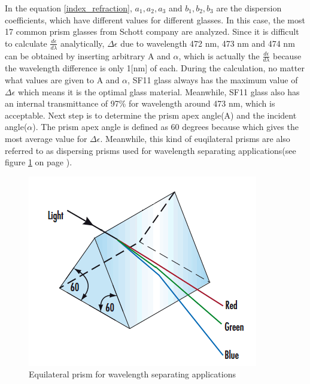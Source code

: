 In the equation \ref{index_refraction}, $a_{1}, a_{2}, a_{3}$ and $b_{1}, b_{2}, b_{3}$ are the dispersion coefficients, which have different values for different glasses. In this case, the most 17 common prism glasses from Schott\cite{prism_material}\cite{prism_book} company are analyzed. Since it is difficult to calculate $\frac{d\epsilon}{d\lambda}$ analytically, $\Delta\epsilon$ due to wavelength 472 nm, 473 nm and 474 nm can be obtained by inserting arbitrary A and $\alpha$, which is actually the $\frac{d\epsilon}{d\lambda}$ because the wavelength difference is only 1[nm] of each. During the calculation, no matter what values are given to A and $\alpha$, SF11 glass always has the maximum value of $\Delta\epsilon$ which means it is the optimal glass material. Meanwhile, SF11 glass also has an internal transmittance of 97\% for wavelength around 473 nm, which is acceptable. Next step is to determine the prism apex angle(A) and the incident angle($\alpha$). The prism apex angle is defined as 60 degrees because which gives the most average value for $\Delta\epsilon$. Meanwhile, this kind of euqilateral prisms are also referred to as dispersing prisms used for wavelength separating applications(see figure \ref{fig:prism_equilateral} on page \pageref{fig:prism_equilateral}). 

\begin{figure}[ht!]
\centering
\includegraphics[scale = 0.8]{chapters/img/prism_equilateral.png}
\caption{Equilateral prism for wavelength separating applications}
\label{fig:prism_equilateral}
\end{figure}

